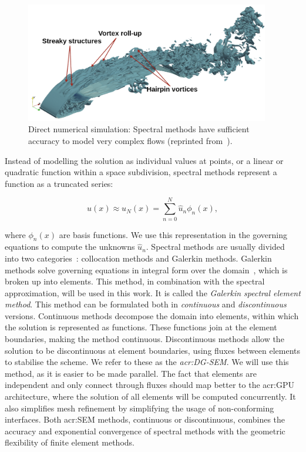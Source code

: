\begin{figure}[H]
	\centering
	\includegraphics[width=0.95\textwidth]{Chapter_introduction/media/spectral_element_method}
	\caption{Direct numerical simulation: Spectral methods have sufficient accuracy to model very complex flows (reprinted from~\cite{Vadsola2021}).}\label{fig:intro_sem}
\end{figure}

Instead of modelling the solution as individual values at points, or a linear or quadratic function
within a space subdivision, spectral methods represent a function as a truncated series:

\begin{equation}
	u(x) \approx u_N(x) = \sum_{n = 0}^{N} \widehat{u}_n \phi _n(x),
\end{equation}

\noindent
where \(\phi _n(x)\) are basis functions. We use this representation in the governing equations to
compute the unknowns \(\widehat{u}_n\). Spectral methods are usually divided into two
categories~\cite{Karniadakis2005}: collocation methods and Galerkin methods. Galerkin methods solve
governing equations in integral form over the domain~\cite{Reed1973}, which is broken up into
elements. This method, in combination with the spectral approximation, will be used in this work. It
is called the \textit{Galerkin spectral element method}. This method can be formulated both in
\textit{continuous} and \textit{discontinuous} versions. Continuous methods decompose the domain
into elements, within which the solution is represented as functions. These functions join at the
element boundaries, making the method continuous. Discontinuous methods allow the solution to be
discontinuous at element boundaries, using fluxes between elements to stabilise the scheme. We refer
to these as the \textit{\acrfull{acr:DG-SEM}}. We will use this method, as it is easier to be made
parallel. The fact that elements are independent and only connect through fluxes should map better
to the \acrshort{acr:GPU} architecture, where the solution of all elements will be computed
concurrently. It also simplifies mesh refinement by simplifying the usage of non-conforming
interfaces. Both \acrshort{acr:SEM} methods, continuous or discontinuous, combines the accuracy and
exponential convergence of spectral methods with the geometric flexibility of finite element
methods. 

